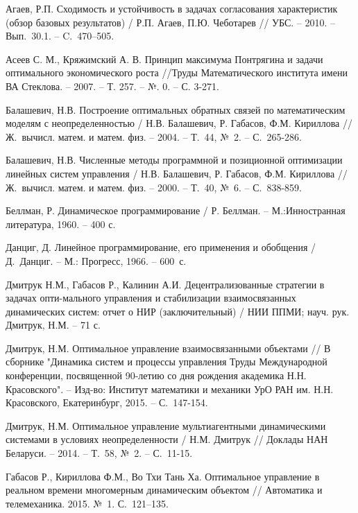 \begin{biblio}

Агаев, Р.П. Сходимость и устойчивость в задачах согласования характеристик (обзор базовых результатов) / Р.П. Агаев, П.Ю. Чеботарев  // УБС. -- 2010. -- Вып.~30.1. -- C.~470–505.

Асеев С. М., Кряжимский А. В. Принцип максимума Понтрягина и задачи оптимального экономического роста //Труды Математического института имени ВА Стеклова. – 2007. – Т. 257. – №. 0. – С. 3-271.

Балашевич, Н.В. Построение оптимальных обратных связей по математическим моделям с неопределенностью  / Н.В. Балашевич,  Р. Габасов,  Ф.М. Кириллова // Ж.~вычисл. матем. и матем.
физ. -- 2004. -- Т.~44, №~2. -- С.~265-286.

Балашевич, Н.В. Численные методы программной и позиционной оптимизации линейных систем управления /
Н.В. Балашевич,  Р. Габасов,  Ф.М. Кириллова // Ж.~вычисл. матем. и матем. физ. -- 2000. -- Т.~40,
№~6. -- С.~838-859.

Беллман, Р. Динамическое программирование / Р. Беллман. -- М.:Инностранная литература, 1960. -- 400 с.

Данциг, Д. Линейное программирование, его применения и обобщения / Д.~Данциг. -- М.: Прогресс,
1966. -- 600~с.

Дмитрук Н.М., Габасов Р., Калинин А.И. Децентрализованные стратегии в задачах опти-мального управления и стабилизации взаимосвязанных динамических систем: отчет о НИР (заключительный) / НИИ ППМИ; науч. рук. Дмитрук, Н.М. – 71 с.

Дмитрук, Н.М. Оптимальное управление взаимосвязанными объектами // В  сборнике "Динамика систем и
процессы управления Труды Международной конференции, посвященной 90-летию со дня рождения академика
Н.Н. Красовского". -- Изд-во: Институт математики и механики УрО РАН им. Н.Н. Красовского,
Екатеринбург, 2015. -- С.~147-154.

Дмитрук, Н.М. Оптимальное управление мультиагентными динамическими системами в условиях неопределенности / Н.М. Дмитрук // Доклады НАН Беларуси. -- 2014. -- Т.~58, №~2. -- С.~11-15.

Габасов Р., Кириллова Ф.М., Во Тхи Тань Ха. Оптимальное управление в реальном времени многомерным динамическим объектом  // Автоматика и телемеханика. 2015. №~1. С.~121--135.


\end{biblio}
